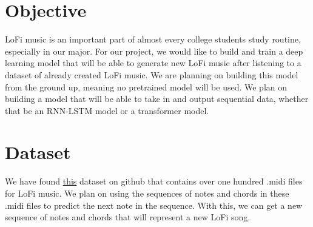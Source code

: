 \documentclass[12pt,letterpaper]{article}
\begin{document}
\section*{Objective}
LoFi music is an important part of almost every college students study routine, especially in our major. For our project, we would like to
build and train a deep learning model that will be able to generate new LoFi music after listening to a dataset of already created LoFi music. We are 
planning on building this model from the ground up, meaning no pretrained model will be used. We plan on building a model that will be able to take in and
output sequential data, whether that be an RNN-LSTM model or a transformer model. 

\section*{Dataset}
We have found \href{https://github.com/nmtremblay/lofi-samples}{this} dataset on github that contains over one hundred .midi files for LoFi music. We plan on using the sequences of notes and chords in these .midi files to predict
the next note in the sequence. With this, we can get a new sequence of notes and chords that will represent a new LoFi song.
\end{document}
